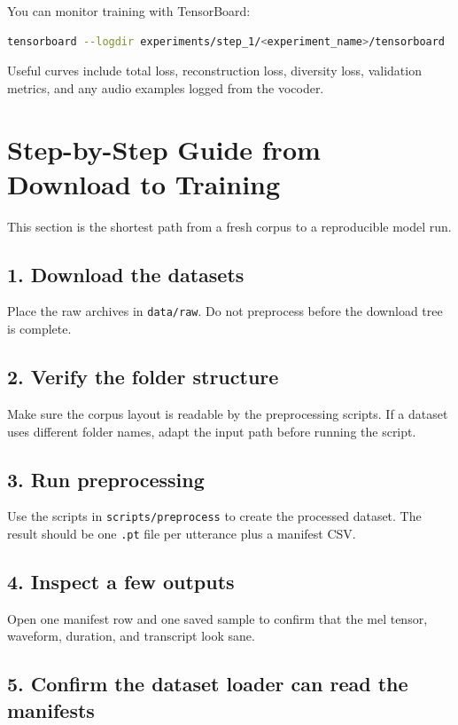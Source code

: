 \documentclass[11pt]{article}
\newcommand{\pathtt}[1]{\texttt{#1}}
\begin{document}
You can monitor training with TensorBoard:

\begin{lstlisting}[language=bash]
tensorboard --logdir experiments/step_1/<experiment_name>/tensorboard
\end{lstlisting}

Useful curves include total loss, reconstruction loss, diversity loss, validation metrics, and any audio examples logged from the vocoder.

\section{Step-by-Step Guide from Download to Training}

This section is the shortest path from a fresh corpus to a reproducible model run.

\subsection{1. Download the datasets}

Place the raw archives in \pathtt{data/raw}. Do not preprocess before the download tree is complete.

\subsection{2. Verify the folder structure}

Make sure the corpus layout is readable by the preprocessing scripts. If a dataset uses different folder names, adapt the input path before running the script.

\subsection{3. Run preprocessing}

Use the scripts in \pathtt{scripts/preprocess} to create the processed dataset. The result should be one \pathtt{.pt} file per utterance plus a manifest CSV.

\subsection{4. Inspect a few outputs}

Open one manifest row and one saved sample to confirm that the mel tensor, waveform, duration, and transcript look sane.

\subsection{5. Confirm the dataset loader can read the manifests}
\end{document}
